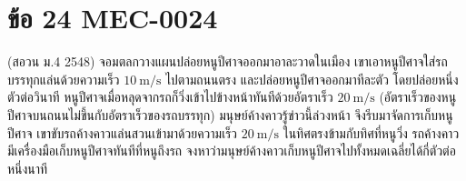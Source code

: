 \section*{ข้อ 24 \hfill \normalsize MEC-0024}
(สอวน ม.4 2548) จอมตลกวางแผนปล่อยหนูปีศาจออกมาอาละวาดในเมือง เขาเอาหนูปีศาจใส่รถบรรทุกแล่นด้วยความเร็ว $10\ \mathrm{m/s}$ ไปตามถนนตรง และปล่อยหนูปีศาจออกมาทีละตัว โดยปล่อยหนึ่งตัวต่อวินาที หนูปีศาจเมื่อหลุดจากรถก็วิ่งเข้าไปข้างหน้าทันทีด้วยอัตราเร็ว $20\ \mathrm{m/s}$ (อัตราเร็วของหนูปีศาจบนถนนไม่ขึ้นกับอัตราเร็วของรถบรรทุก) มนุษย์ค้างคาวรู้ข่าวนี้ล่วงหน้า จึงรีบมาจัดการเก็บหนูปีศาจ เขาขับรถค้างคาวแล่นสวนเข้ามาด้วยความเร็ว $20\ \mathrm{m/s}$ ในทิศตรงข้ามกับทิศที่หนูวิ่ง รถค้างคาวมีเครื่องมือเก็บหนูปีศาจทันทีที่หนูถึงรถ จงหาว่ามนุษย์ค้างคาวเก็บหนูปีศาจไปทั้งหมดเฉลี่ยได้กี่ตัวต่อหนึ่งนาที
\medskip
